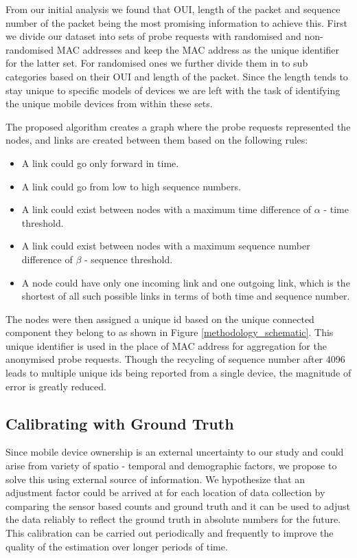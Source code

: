 From our initial analysis we found that OUI, length of the packet and sequence
number of the packet being the most promising information to achieve this.
First we divide our dataset into sets of probe requests with randomised and
non-randomised MAC addresses and keep the MAC address as the unique identifier
for the latter set. For randomised ones we further divide them in to sub
categories based on their OUI and length of the packet. Since the length tends
to stay unique to specific models of devices we are left with the task of
identifying the unique mobile devices from within these sets.

The proposed algorithm creates a graph where the probe requests represented the
nodes, and links are created between them based on the following rules:

\begin{itemize} 
\item A link could go only forward in time. 
\item A link could go from low to high sequence numbers. 
\item A link could exist between nodes with a maximum time difference of
	$\alpha$ - time threshold. 
\item A link could exist between nodes with a maximum sequence number
	difference of $\beta$ - sequence threshold.
\item A node could have only one incoming link and one outgoing link, which is
	the shortest of all such possible links in terms of both time and sequence
	number.
\end{itemize}

The nodes were then assigned a unique id based on the unique connected component
they belong to as shown in Figure \ref{methodology_schematic}. This unique
identifier is used in the place of MAC address for aggregation for the
anonymised probe requests. Though the recycling of sequence number after 4096
leads to multiple unique ids being reported from a single device, the magnitude
of error is greatly reduced. 

\subsection{Calibrating with Ground Truth} 

Since mobile device ownership is an external uncertainty to our study and could
arise from variety of spatio - temporal and demographic factors, we propose to
solve this using external source of information. We hypothesize that an
adjustment factor could be arrived at for each location of data collection by
comparing the sensor based counts and ground truth and it can be used to adjust
the data reliably to reflect the ground truth in absolute numbers for the
future. This calibration can be carried out periodically and frequently to
improve the quality of the estimation over longer periods of time.
